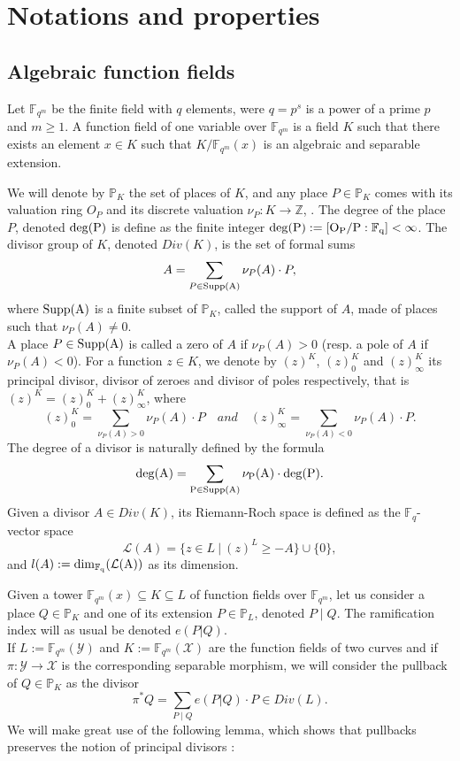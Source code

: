 \documentclass[10pt]{article}
\newcommand{\s}{\vspace{0.3cm}}
\newcommand{\cd}{\cdot}
\newcommand{\Z}{\mathbb{Z}}
\newcommand{\fqm}{\mathbb{F}_{q^m}}
\newcommand{\fq}{\mathbb{F}_q}
\newcommand{\su}{\subseteq}
\newcommand{\X}{\mathcal{X}}
\newcommand{\Y}{\mathcal{Y}}
\begin{document}
\s

\section{Notations and properties}

\s

\subsection{Algebraic function fields}

\s


Let $\fqm$ be the finite field with $q$ elements, were $q=p^s$ is a power of a prime $p$ and $m \geq 1$. A function field of one variable over $\fqm$ is a field $K$ such that there exists an element $x\in K$ such that $K/\fqm(x)$ is an algebraic and separable extension. 

We will denote by $\mathbb{P}_K$ the set of places of $K$, and any place $P \in \mathbb{P}_K$ comes with its valuation ring $O_P$ and its discrete valuation $\nu_P : K \rightarrow \Z$, . The degree of the place $P$, denoted $\rm{deg}(P)$ is define as the finite integer $\rm{deg}(P) := [O_P/P:\fq] < \infty$.
The divisor group of $K$, denoted $Div(K)$, is the set of formal sums 
\[A = \sum\limits_{P \in \rm{Supp}(A)} \nu_P(A) \cd P,\]
where $\rm{Supp}(A)$ is a finite subset of $\mathbb{P}_K$, called the support of $A$, made of places such that $\nu_{P}(A) \neq 0$. \\ A place  $P \in \rm{Supp}(A)$ is called a zero of $A$ if $\nu_P(A) >0$ (resp. a pole of $A$ if $\nu_P(A) < 0$). For a function $z \in K$, we denote by $(z)^K$, $(z)^K_0$ and $(z)^K_{\infty}$ its principal divisor, divisor of zeroes and divisor of poles respectively, that is $(z)^K = (z)^K_0 + (z)^K_{\infty}$, where 
\[(z)^K_0 = \sum\limits_{\nu_P(A) > 0}\nu_P(A) \cd P \quad and \quad (z)^K_{\infty} = \sum\limits_{\nu_P(A) < 0}\nu_P(A) \cd P.\]
The degree of a divisor is naturally defined by the formula
\[\rm{deg}(A) = \sum\limits_{P \in \rm{Supp}(A)} \nu_P(A) \cd \rm{deg}(P).\]
Given a divisor $A \in Div(K)$, its Riemann-Roch space is defined as the $\fq$-vector space
\[\mathcal{L}(A) = \{z \in L \ | \ (z)^L \geq -A\} \cup \{0\},\]
and $l(A):= \rm{dim}_{\fq}(\mathcal{L}(A))$ as its dimension.

\s

Given a tower $\fqm(x) \su K \su L$ of function fields over $\fqm$, let us consider a place  $Q \in \mathbb{P}_K$ and one of its extension $P \in \mathbb{P}_L$, denoted $P\mid Q$. The ramification index will as usual be denoted $e(P|Q)$. \\
If $L := \fqm(\Y)$ and $K:=\fqm(\X)$ are the function fields of two curves and if $\pi : \Y \rightarrow \X$ is the corresponding separable morphism, we will consider the pullback of $Q \in \mathbb{P}_K$ as the divisor
\[\pi^*Q = \sum\limits_{P \mid Q} e(P|Q) \cd P \in Div(L).\]
We will make great use of the following lemma, which shows that pullbacks preserves the notion of principal divisors :
\end{document}
